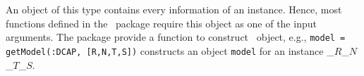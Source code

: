 An object of this type contains every information of an instance. Hence, most functions defined in the \siplibtwo\ package require this object as one of the input arguments. The package provide a function to construct \jumpmodel\ object, e.g., \texttt{model = getModel(:DCAP, [R,N,T,S])} constructs an object \texttt{model} for an instance \dcap\_$R$\_$N$\_$T$\_$S$.
%
%
